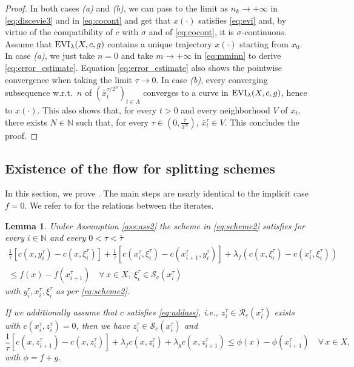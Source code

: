 \documentclass[reqno]{amsart}
\newcounter{results}[section]
\theoremstyle{plain}
\newtheorem{lemma}[results]{Lemma}
\theoremstyle{remark}
\theoremstyle{plain}
\numberwithin{equation}{section}
\theoremstyle{remark}
\newcommand{\N}{\mathbb{N}}
\DeclareMathOperator{\EVI}{{\rm EVI}}
\begin{document}
\begin{proof}
In both cases {\it (a)} and {\it (b)}, we can pass to the limit as $n_k \to + \infty$ in \eqref{eq:discevie3} and in \eqref{eq:cocont} and  get that $x(\cdot)$ satisfies \eqref{eq:evi} and,  by virtue of  the compatibility of $c$ with $\sigma$ and  of  \eqref{eq:cocont}, it is $\sigma$-continuous.
Assume that $\EVI_\lambda(X,c,g)$  contains  a unique trajectory $x(\cdot)$ starting from $x_0$. In case {\it (a)}, we just take $n=0$ and take $m\to+\infty$ in \eqref{eq:mminn} to derive \eqref{eq:error_estimate}.  Equation  \eqref{eq:error_estimate} also shows the pointwise convergence when taking the limit $\tau\to 0$. In case {\it (b)}, every converging subsequence w.r.t.\ $n$ of $(\bar{x}_t^{\tau/2^{n}})_{t\in A}$  converges  to a curve  in   $\EVI_\lambda(X,c,g)$, hence to $x(\cdot)$. This also shows that, for every $t>0$ and every neighborhood $V$ of $x_t$, there  exists   $N\in\N$ such that, for every $\tau\in (0,\frac{\bar \tau}{2^N})$, $\bar{x}_t^{\tau}\in V$.  This  concludes the proof.
\end{proof}

\subsection{Existence of the flow for splitting schemes}\label{sec:f+gproof}

In this section, we prove . The main steps are nearly identical to the implicit case $f=0$. We refer to  for the relations between the iterates.

\begin{lemma}\label{le:evi_f_fg} Under Assumption \ref{ass:ass2} the scheme in \eqref{eq:scheme2} satisfies for every $i \in  \N $ and every $0<\tau< \bar{\tau}$
\begin{multline}\label{eq:evidisc_f}
\frac{1}{\tau} [c(x,y_{i}^\tau)-c(x,\xi_{i}^\tau)]+\frac{1}{\tau} [c(x_{i}^\tau,\xi_{i}^\tau)-c(x_{i+1}^\tau,y_{i}^\tau)]+\lambda_f (c(x,\xi_{i}^\tau)-c(x_{i}^\tau,\xi_{i}^\tau))
\\ \leq f(x)-f(x_{i+1}^\tau) \quad \forall \, x \in X, \ \xi_{i}^\tau \in \mathcal{S}_c(x_{i}^\tau) 
\end{multline} 
 with  $y^\tau_i,x_{i}^\tau,\xi_{i}^\tau$ as per \eqref{eq:scheme2}. 

If we additionally assume that   $c$ satisfies \eqref{eq:addass},  i.e., $z_{i}^\tau\in \mathcal{R}_c(x_{i}^\tau)$ exists with $c(x_{i}^\tau,z_{i}^\tau)=0$, then we have $z_{i}^\tau\in \mathcal{S}_c(x_{i}^\tau)$ and
\begin{equation}\label{eq:evidisc_fg}
\frac{1}{\tau} [c(x,z_{i+1}^\tau)-c(x,z_{i}^\tau)]
        +\lambda_f c(x,z_{i}^\tau)+\lambda_g c(x,z_{i+1}^\tau)
    \le \phi(x)-\phi(x_{i+1}^\tau) \quad \forall \, x \in X,
\end{equation} 
with $\phi=f+g$.
\end{lemma}
\end{document}

